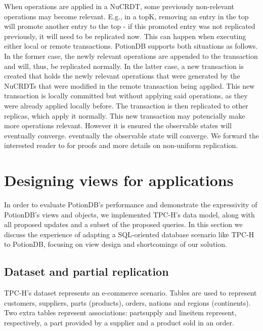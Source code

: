 \documentclass[sigplan,10pt]{acmart}
\begin{document}
When operations are applied in a NuCRDT, some previously non-relevant operations may become relevant.
E.g., in a topK, removing an entry in the top will promote another entry to the top - if this promoted entry was not replicated previously, it will need to be replicated now.
This can happen when executing either local or remote transactions.
PotionDB supports both situations as follows.
In the former case, the newly relevant operations are appended to the transaction and will, thus, be replicated normally.
In the latter case, a new transaction is created that holds the newly relevant operations that were generated by the NuCRDTs that were modified in the remote transaction being applied.
This new transaction is locally committed but without applying said operations, as they were already applied locally before.
The transaction is then replicated to other replicas, which apply it normally.
This new transaction may potencially make more operations relevant.
However it is ensured the observable states will eventually converge.
eventually the observable state will converge.
We forward the interested reader to \cite{Cabrita17Nonuniform} for proofs and more details on non-uniform replication.

\section{Designing views for applications}
\label{sec:views_for_apps}

In order to evaluate PotionDB's performance and demonstrate the expressivity of PotionDB's views and objects, we implemented TPC-H's data model, along with all proposed updates and a subset of the proposed queries.
In this section we discuss the experience of adapting a SQL-oriented database scenario like TPC-H to PotionDB, focusing on view design and shortcomings of our solution.

\subsection{Dataset and partial replication}
\label{subsec:dataset}

TPC-H's dataset represents an e-commerce scenario. %
Tables are used to represent customers, suppliers, parts (products), orders, nations and regions (continents).
Two extra tables represent associations: partsupply and lineitem represent, respectively, a part provided by a supplier and a product sold in an order. %
\end{document}
